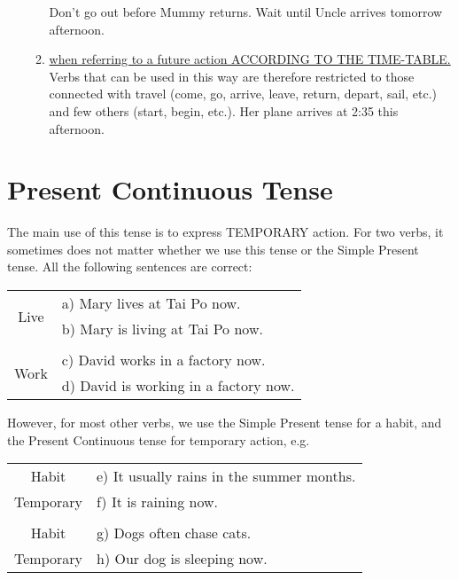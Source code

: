 \begin{enumerate}
\begin{enumerate}
                Don't go out before Mummy returns.
                \newline
                Wait until Uncle arrives tomorrow afternoon.
            \item \underline{when referring to a future action ACCORDING TO THE 
                TIME-TABLE.}
                \newline
                Verbs that can be used in this way are therefore restricted to
                those connected with travel (come, go, arrive, leave, return,
                depart, sail, etc.) and few others (start, begin, etc.).
                \newline
                Her plane arrives at 2:35 this afternoon.
        \end{enumerate}
\end{enumerate}

\section{Present Continuous Tense}
The main use of this tense is to express TEMPORARY action.
For two verbs, it sometimes does not matter whether we use this tense or the
Simple Present tense.
All the following sentences are correct:
\begin{center}
\begin{tabular}{|cl|}
    \hline
    \multirow{2}{*}{Live} & a) Mary lives at Tai Po now. \\
                          & b) Mary is living at Tai Po now. \\ 
                          & \\
    \multirow{2}{*}{Work} & c) David works in a factory now. \\
                          & d) David is working in a factory now. \\ \hline
\end{tabular}
\end{center}

However, for most other verbs, we use the Simple Present tense for a habit,
and the Present Continuous tense for temporary action, e.g.
\begin{center}
\begin{tabular}{|cl|}
    \hline
    Habit     & e) It usually rains in the summer months. \\
    Temporary & f) It is raining now. \\
              & \\
    Habit     & g) Dogs often chase cats. \\
    Temporary & h) Our dog is sleeping now. \\ \hline
\end{tabular}
\end{center}

